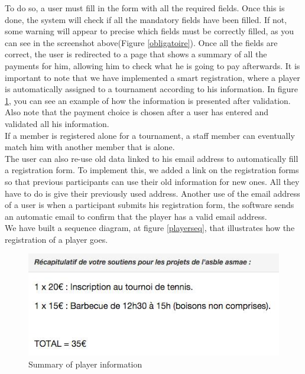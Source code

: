 \documentclass[a4paper, 12pt]{article}
\begin{document}
To do so, a user must fill in the form with all the required fields. Once this is done, the system will check if all the mandatory fields have been filled. If not, some warning will appear to precise which fields must be correctly filled, as you can see in the screenshot above(Figure \ref{obligatoire}). Once all the fields are correct, the user is redirected to a page that shows a summary of all the payments for him, allowing him to check what he is going to pay afterwards. It is important to note that we have implemented a smart registration, where a player is automatically assigned to a tournament according to his information. In figure \ref{recap}, you can see an example of how the information is presented after validation. Also note that the payment choice is chosen after a user has entered and validated all his information.\\

If a member is registered alone for a tournament, a staff member can eventually match him with another member that is alone.\\

The user can also re-use old data linked to his email address to automatically fill a registration form. To implement this, we added a link on the registration forms so that previous participants can use their old information for new ones. All they have to do is give their previously used address. Another use of the email address of a user is when a participant submits his registration form, the software sends an automatic email to confirm that the player has a valid email address.\\

We have built a sequence diagram, at figure \ref{playerseq}, that illustrates how the registration of a player goes.\\
\begin{figure}[h]
  \caption{\label{recap} Summary of player information}
  \includegraphics[scale=0.7]{recap.png}
\end{figure}
\end{document}
